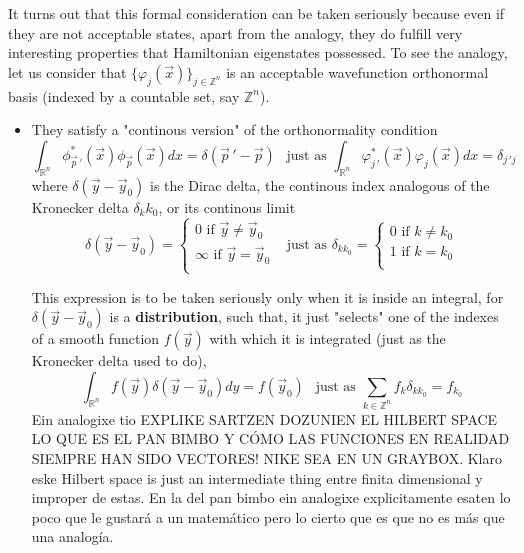 \documentclass[11pt, a4paper]{article} %
\newcommand{\R}{\mathbb{R}} %
\newcommand{\Z}{\mathbb{Z}} %
\DeclareRobustCommand{\mybox}[2][gray!10]{%
\begin{tcolorbox}[   %
        left=0.2cm,
        right=0.2cm,
        top=0.15cm,
        bottom=0.15cm,
        colback=#1,
        colframe=#1,
        width=\dimexpr\textwidth\relax, 
        enlarge left by=0mm,
        boxsep=5pt,
        arc=0pt,outer arc=0pt,
        ]
        #2
\end{tcolorbox}
}
\begin{document}
It turns out that this formal consideration can be taken seriously because even if they are not acceptable states, apart from the analogy, they do fulfill very interesting properties that Hamiltonian eigenstates possessed. To see the analogy, let us consider that $\{\varphi_j(\vec{x})\}_{j\in\Z^n}$ is an acceptable wavefunction orthonormal basis (indexed by a countable set, say $\Z^n$).
\begin{itemize}
\item They satisfy a "continous version" of the orthonormality condition
\begin{equation}
\int_{\R^n} \phi_{\vec{p}\,'}^*(\vec{x})\phi_{\vec{p}}(\vec{x})dx=\delta(\vec{p}\,'-\vec{p}) \ \ \text{ just as } \int_{\R^n} \varphi_{j\,'}^*(\vec{x})\varphi_{j}(\vec{x})dx=\delta_{j\,'j}
\end{equation}
where $\delta(\vec{y}-\vec{y}_0)$ is the Dirac delta, the continous index analogous of the Kronecker delta $\delta_kk_0$, or its continous limit
\begin{equation}
\delta(\vec{y}-\vec{y}_0)=\begin{cases}
0 \text{ if  }\vec{y}\neq \vec{y}_0\\
\infty \text{ if  }\vec{y}=\vec{y}_0\\
\end{cases} \ \ \text{ just as } \delta_{kk_0}=\begin{cases}
0 \text{ if  }k\neq k_0\\
1 \text{ if  }k=k_0\\
\end{cases}
\end{equation}
\mybox{
This expression is to be taken seriously only when it is inside an integral, for $\delta(\vec{y}-\vec{y}_0)$ is a {\bf distribution}, such that, it just "selects" one of the indexes of a smooth function $f(\vec{y})$ with which it is integrated (just as the Kronecker delta used to do),
\begin{equation}
\int_{\R^n}f(\vec{y})\delta(\vec{y}-\vec{y}_0) dy=f(\vec{y}_0) \ \ \text{ just as } \sum_{k\in\Z^n} f_k\delta_{kk_0} = f_{k_0}
\end{equation}
Ein analogixe tio
EXPLIKE SARTZEN DOZUNIEN EL HILBERT SPACE LO QUE ES EL PAN BIMBO Y CÓMO LAS FUNCIONES EN REALIDAD SIEMPRE HAN SIDO VECTORES! NIKE SEA EN UN GRAYBOX.
Klaro eske Hilbert space is just an intermediate thing entre finita dimensional y improper de estas. En la del pan bimbo ein analogixe explicitamente esaten lo poco que le gustará a un matemático pero lo cierto que es que no es más que una analogía.

}
\end{itemize}
\end{document}
